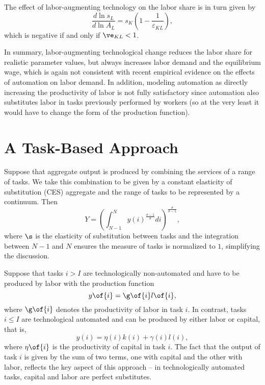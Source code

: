 \documentclass[12pt]{article}
\theoremstyle{definition}
\begin{document}
The effect of labor-augmenting technology on the labor share is in turn given by 
\begin{equation}
    \label{eq_latc_labor_share}
    \frac{d \ln s_L}{d \ln A_L}=s_K\left(1-\frac{1}{\varepsilon_{K L}}\right),
\end{equation}
which is negative if and only if $\ve_{KL} < 1$.

In summary, labor-augmenting technological change reduces the labor share for realistic parameter values, but always increases labor demand and the equilibrium wage, which is again not consistent with recent empirical evidence on the effects of automation on labor demand. In addition, modeling automation as directly increasing the productivity of labor is not fully satisfactory since automation also substitutes labor in tasks previously performed by workers (so at the very least it would have to change the form of the production function).

\section{A Task-Based Approach}

Suppose that aggregate output is produced by combining the services of a range of tasks. We take this combination to be given by a constant elasticity of substitution (CES) aggregate and the range of tasks to be represented by a continuum. Then 
\begin{equation}
    \label{eq_tm_production_func}
    Y = \left(\int_{N-1}^N y(i)^{\frac{\sigma-1}{\sigma}} d i\right)^{\frac{\sigma}{\sigma-1}},
\end{equation}
where $\s$ is the elasticity of substitution between tasks and the integration between $N-1$ and $N$ ensures the measure of tasks is normalized to $1$, simplifying the discussion. 

Suppose that tasks $i > I$ are technologically non-automated and have to be produced by labor with the production function 
\begin{equation}
    \label{eq_tm_non_automated_task_prod}
    y\of{i} = \g\of{i} l\of{i},
\end{equation}
where $\g\of{i}$ denotes the productivity of labor in task $i$. In contrast, tasks $i \leq I$ are technological automated and can be produced by either labor or capital, that is, 
\begin{equation}
    \label{eq_tm_automated_task_prod}
    y(i)=\eta(i) k(i)+\gamma(i) l(i) ,
\end{equation}
where $\eta\of{i}$ is the productivity of capital in task $i$. The fact that the output of task $i$ is given by the sum of two terms, one with capital and the other with labor, reflects the key aspect of this approach -- in technologically automated tasks, capital and labor are perfect substitutes.
\end{document}

